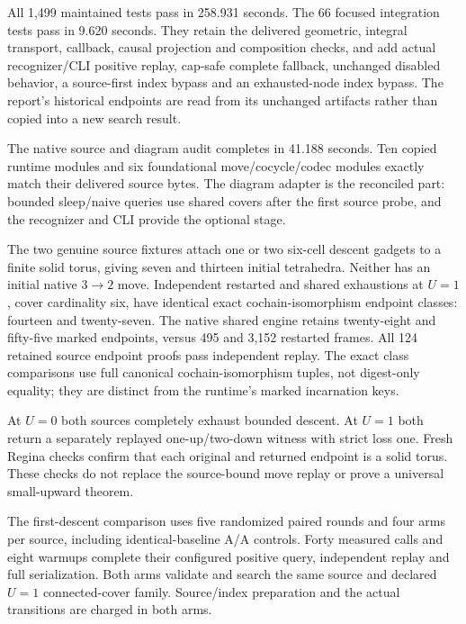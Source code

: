 All 1,499 maintained tests pass in 258.931 seconds. The 66 focused integration
tests pass in 9.620 seconds. They retain the delivered geometric, integral
transport, callback, causal projection and composition checks, and add
actual recognizer/CLI positive replay, cap-safe complete fallback, unchanged
disabled behavior, a source-first index bypass and an exhausted-node index
bypass. The report's historical endpoints are read from its unchanged
artifacts rather than copied into a new search result.

The native source and diagram audit completes in 41.188 seconds. Ten copied
runtime modules and six foundational move/cocycle/codec modules exactly
match their delivered source bytes. The diagram adapter is the reconciled
part: bounded sleep/naive queries use shared covers after the first source
probe, and the recognizer and CLI provide the optional stage.

The two genuine source fixtures attach one or two six-cell descent gadgets
to a finite solid torus, giving seven and thirteen initial tetrahedra. Neither
has an initial native $3\to2$ move. Independent restarted and shared
exhaustions at $U=1$, cover cardinality six, have identical exact
cochain-isomorphism endpoint classes: fourteen and twenty-seven. The native
shared engine retains twenty-eight and fifty-five marked endpoints, versus
495 and 3,152 restarted frames. All 124 retained source endpoint proofs
pass independent replay. The exact class comparisons use full canonical
cochain-isomorphism tuples, not digest-only equality; they are distinct from
the runtime's marked incarnation keys.

At $U=0$ both sources completely exhaust bounded descent. At $U=1$ both
return a separately replayed one-up/two-down witness with strict loss one.
Fresh Regina checks confirm that each original and returned endpoint is a
solid torus. These checks do not replace the source-bound move replay or
prove a universal small-upward theorem.

The first-descent comparison uses five randomized paired rounds and four
arms per source, including identical-baseline A/A controls. Forty measured
calls and eight warmups complete their configured positive query, independent
replay and full serialization. Both arms validate and search the same source
and declared $U=1$ connected-cover family. Source/index preparation and the
actual transitions are charged in both arms.



